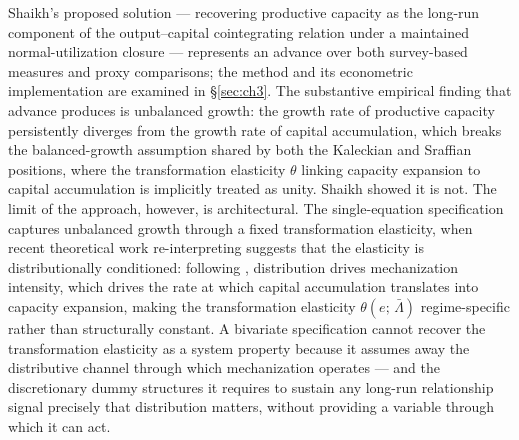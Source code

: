 \documentclass[11pt,a4paper]{article}
\begin{document}

Shaikh's proposed solution --- recovering productive capacity as the
long-run component of the output--capital cointegrating relation under a
maintained normal-utilization closure --- represents an advance over both
survey-based measures and proxy comparisons; the method and its econometric
implementation are examined in \S\ref{sec:ch3}. The substantive empirical
finding that advance produces is unbalanced growth: the growth rate of
productive capacity persistently diverges from the growth rate of capital
accumulation, which breaks the balanced-growth assumption shared by both the
Kaleckian and Sraffian positions, where the transformation elasticity
$\theta$ linking capacity expansion to capital accumulation is implicitly
treated as unity. Shaikh showed it is not. The limit of the approach,
however, is architectural. The single-equation specification captures
unbalanced growth through a fixed transformation elasticity, when recent
theoretical work re-interpreting \citet{Kaldor1957} suggests that the
elasticity is distributionally conditioned: following \citet{Cajas2024},
distribution drives mechanization intensity, which drives the rate at which
capital accumulation translates into capacity expansion, making the
transformation elasticity $\theta(e;\,\bar{\Lambda})$ regime-specific rather
than structurally constant. A bivariate specification cannot recover the
transformation elasticity as a system property because it assumes away the
distributive channel through which mechanization operates --- and the
discretionary dummy structures it requires to sustain any long-run
relationship signal precisely that distribution matters, without providing a
variable through which it can act.

\end{document}
